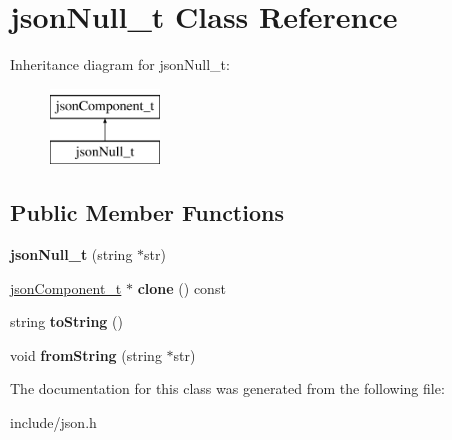 \hypertarget{classjsonNull__t}{\section{json\-Null\-\_\-t \-Class \-Reference}
\label{classjsonNull__t}
}
\-Inheritance diagram for json\-Null\-\_\-t\-:\begin{figure}[H]
\begin{center}
\leavevmode
\includegraphics[height=2.000000cm]{classjsonNull__t}
\end{center}
\end{figure}
\subsection*{\-Public \-Member \-Functions}
\begin{DoxyCompactItemize}
\item 
\hypertarget{classjsonNull__t_ae8f556e438638833c32941e42d1510ac}{{\bfseries json\-Null\-\_\-t} (string $\ast$str)}\label{classjsonNull__t_ae8f556e438638833c32941e42d1510ac}

\item 
\hypertarget{classjsonNull__t_ab04b8638e10300ec332a07a4d236268c}{\hyperlink{classjsonComponent__t}{json\-Component\-\_\-t} $\ast$ {\bfseries clone} () const }\label{classjsonNull__t_ab04b8638e10300ec332a07a4d236268c}

\item 
\hypertarget{classjsonNull__t_a1720682d84178bbfcdcbf204e9d6a269}{string {\bfseries to\-String} ()}\label{classjsonNull__t_a1720682d84178bbfcdcbf204e9d6a269}

\item 
\hypertarget{classjsonNull__t_ac271c2ab01c899e8a2254dbeeddc4ae5}{void {\bfseries from\-String} (string $\ast$str)}\label{classjsonNull__t_ac271c2ab01c899e8a2254dbeeddc4ae5}

\end{DoxyCompactItemize}


\-The documentation for this class was generated from the following file\-:\begin{DoxyCompactItemize}
\item 
include/json.\-h\end{DoxyCompactItemize}
